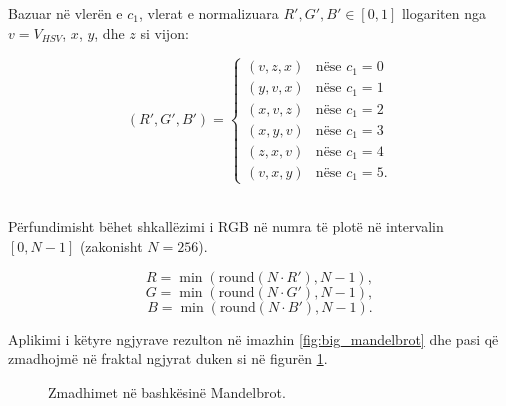 \noindent  Bazuar në  vlerën e  $c_1$, vlerat e normalizuara $R', G', B' \in [0,1]$ llogariten nga $v = V_{HSV}$, $x$, $y$, dhe $z$ si vijon:

\[
(R', G', B') = 
\begin{cases}
    (v, z, x) & \text{nëse } c_1 = 0 \\
    (y, v, x) & \text{nëse } c_1 = 1 \\
    (x, v, z) & \text{nëse } c_1 = 2 \\
    (x, y, v) & \text{nëse } c_1 = 3 \\
    (z, x, v) & \text{nëse } c_1 = 4 \\
    (v, x, y) & \text{nëse } c_1 = 5.
\end{cases} 
\]

\noindent \\  Përfundimisht bëhet shkallëzimi i RGB në numra të plotë në intervalin $[0, N - 1]$ (zakonisht $N = 256$).

\[
R = \min(\text{round}(N \cdot R'), N - 1),
\]
\[
G = \min(\text{round}(N \cdot G'), N - 1),
\]
\[
B = \min(\text{round}(N \cdot B'), N - 1). 
\]

\noindent Aplikimi i këtyre ngjyrave rezulton në imazhin \ref{fig:big_mandelbrot} dhe pasi që zmadhojmë në fraktal ngjyrat duken si në figurën \ref{mandelbrot_minis}.

 \begin{figure}[htbp]
\centering
{}
\caption{Zmadhimet në bashkësinë Mandelbrot.}
\label{mandelbrot_minis}
\end{figure}


